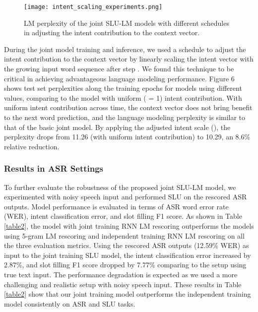 \documentclass[11pt]{article}
\begin{document}
        \begin{figure}[h]
            \centering
            \texttt{[image: intent\_scaling\_experiments.png]}
            \caption{{LM perplexity of the joint SLU-LM models with different schedules in adjusting the intent contribution to the context vector. }}
            \label{fig:intent_scaling_experiments}
        \end{figure}
        
    During the joint model training and inference, we used a schedule to adjust the intent contribution to the context vector by linearly scaling the intent vector with the growing input word sequence after step . We found this technique to be critical in achieving advantageous language modeling performance. Figure 6 shows test set perplexities along the training epochs for models using different  values, comparing to the model with uniform ( = 1) intent contribution. With uniform intent contribution across time, the context vector does not bring benefit to the next word prediction, and the language modeling perplexity is similar to that of the basic joint model. By applying the adjusted intent scale (), the perplexity drops from 11.26 (with uniform intent contribution) to 10.29, an 8.6\% relative reduction.
 
    \subsubsection{Results in ASR Settings}
    To further evaluate the robustness of the proposed joint SLU-LM model, we experimented with noisy speech input and performed SLU on the rescored ASR outputs. Model performance is evaluated in terms of ASR word error rate (WER), intent classification error, and slot filling F1 score. As shown in Table \ref{table2}, the model with joint training RNN LM rescoring outperforms the models using 5-gram LM rescoring and independent training RNN LM rescoring on all the three evaluation metrics. Using the rescored ASR outputs (12.59\% WER) as input to the joint training SLU model, the intent classification error increased by 2.87\%, and slot filling F1 score dropped by 7.77\% comparing to the setup using true text input. The performance degradation is expected as we used a more challenging and realistic setup with noisy speech input. These results in Table \ref{table2} show that our joint training model outperforms the independent training model consistently on ASR and SLU tasks.
    
\end{document}
